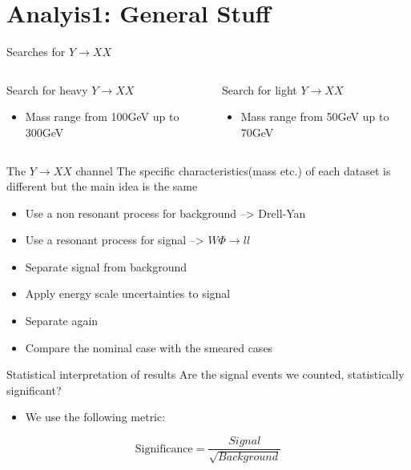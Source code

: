 \documentclass[bigger]{beamer}
\begin{document}
\section{Analyis1: General Stuff}
\label{sec:org8de0410}
\begin{frame}[label={sec:org4f63ad1}]{Searches for \(Y \rightarrow XX\)}
\begin{columns}
\begin{column}{0.5\columnwidth}
Search for heavy \(Y \rightarrow XX\)
\begin{itemize}
\item Mass range from 100GeV up to 300GeV
\end{itemize}
\end{column}
\begin{column}{0.5\columnwidth}
Search for light \(Y \rightarrow XX\)
\begin{itemize}
\item Mass range from 50GeV up to 70GeV
\end{itemize}
\end{column}
\end{columns}
\end{frame}
\begin{frame}[label={sec:org320386f}]{The \(Y \rightarrow XX\) channel}
The specific characteristics(mass etc.) of each dataset  is different but the main idea is the same
\begin{itemize}
\item Use a non resonant process for background --> Drell-Yan
\item Use a resonant process for signal --> \(W\Phi \rightarrow ll\)
\item Separate signal from background
\item Apply energy scale uncertainties to signal
\item Separate again
\item Compare the nominal case with the smeared cases
\end{itemize}
\end{frame}
\begin{frame}[label={sec:orgec3da7f}]{Statistical interpretation of results}
\alert{Are the signal events we counted, statistically significant?}
\begin{itemize}
\item We use the following metric:
\end{itemize}
\begin{equation}
\text{Significance} = \frac{Signal}{\sqrt{Background}}
\end{equation}
\end{frame}
\end{document}
